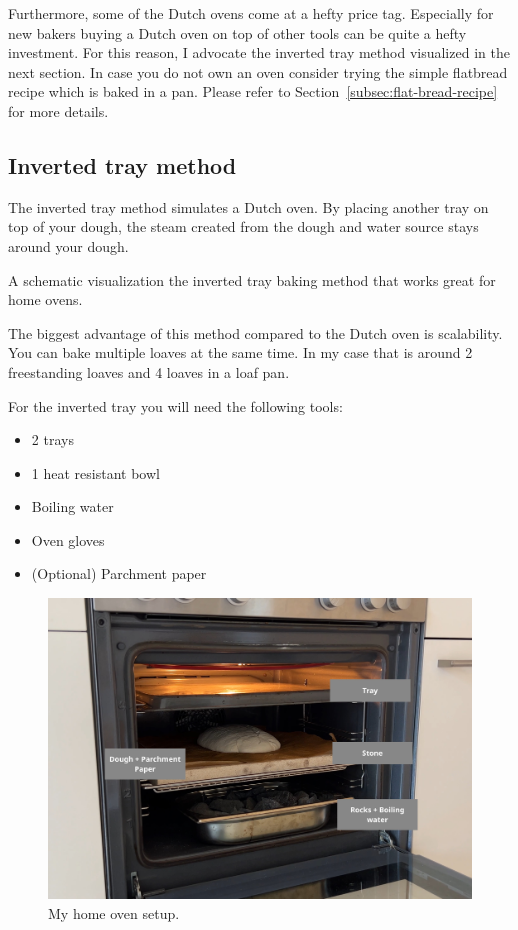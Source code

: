 Furthermore, some of the Dutch ovens come at a hefty
price tag. Especially for new bakers buying a Dutch oven on
top of other tools can be quite a hefty investment. For
this reason, I advocate the inverted tray method visualized
in the next section. In case you do not own an oven consider trying
the simple flatbread recipe which is baked in a pan. Please
refer to Section~\ref{subsec:flat-bread-recipe} for more details.


\subsection{Inverted tray method}

The inverted tray method simulates a Dutch oven.
By placing another tray on top of your dough, the steam
created from the dough and water source stays
around your dough.

\begin{flowchart}[!htb]
\centering
  
  \caption[Inverted tray baking process]{A schematic visualization the
  inverted tray baking method that works great for home ovens.}%
  \label{fig:inverted-tray-process}
\end{flowchart}


The biggest advantage of this method compared to the
Dutch oven is scalability. You can bake multiple loaves
at the same time. In my case that is around 2 freestanding
loaves and 4 loaves in a loaf pan.

For the inverted tray you will need the following tools:
\begin{itemize}
\item 2 trays
\item 1 heat resistant bowl
\item Boiling water
\item Oven gloves
\item (Optional) Parchment paper
\end{itemize}

\begin{figure}[!htb]
  \includegraphics[width=\textwidth]{baking-example.jpg}
  \caption{My home oven setup.}
\end{figure}

